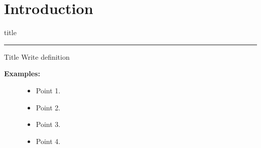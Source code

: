 \documentclass{beamer} %
\begin{document}
\section{\textbf{Introduction}}
    \begin{frame}[plain]
        \vfill
      \centering
      \begin{beamercolorbox}[sep=8pt,center,shadow=true,rounded=true]{title}
        \insertsectionhead\par%
        \color{blue}\noindent\rule{10cm}{1pt}
      \end{beamercolorbox}
      \vfill
  \end{frame}
\begin{frame}{Title}
    Write definition
    
    \textbf{Examples:}
    
    \vspace{10pt} %
    \begin{figure}
        \begin{minipage}{0.4\textwidth}
            \begin{itemize}
                \item Point 1.
                \item Point 2.
                \item Point 3.
                \item Point 4.
            \end{itemize}
        \end{minipage}
        \hfill
                
                
                
                

\end{figure}
\end{frame}
\end{document}
